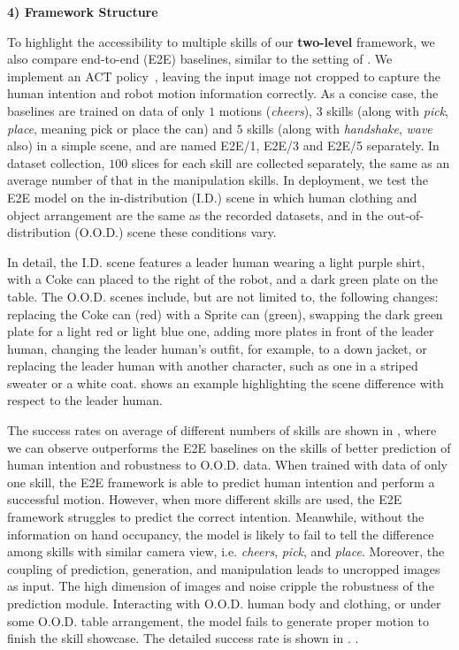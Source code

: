 \noindent\textbf{4) Framework Structure}


To highlight the accessibility to multiple skills of our \textbf{two-level} framework, we also compare end-to-end (E2E) baselines, similar to the setting of \citet{cardenas2024xbg}. 
We implement an ACT policy~\cite{zhao2023learning,cheng2024tv}, leaving the input image not cropped to capture the human intention and robot motion information correctly.
As a concise case, the baselines are trained on data of only $1$ motions (\textit{cheers}), $3$ skills (along with \textit{pick}, \textit{place}, meaning pick or place the can) and $5$ skills (along with \textit{handshake}, \textit{wave} also) in a simple scene, and are named E2E/1, E2E/3 and E2E/5 separately. 
In dataset collection, $100$ slices for each skill are collected separately, the same as an average number of that in the manipulation skills.
In deployment, we test the E2E model on the in-distribution (I.D.) scene in which human clothing and object arrangement are the same as the recorded datasets, and in the out-of-distribution (O.O.D.) scene these conditions vary.

In detail, the I.D. scene features a leader human wearing a light purple shirt, with a Coke can placed to the right of the robot, and a dark green plate on the table.
The O.O.D. scenes include, but are not limited to, the following changes: replacing the Coke can (red) with a Sprite can (green), swapping the dark green plate for a light red or light blue one, adding more plates in front of the leader human, changing the leader human's outfit, for example, to a down jacket, or replacing the leader human with another character, such as one in a striped sweater or a white coat.
 shows an example highlighting the scene difference with respect to the leader human.

The success rates on average of different numbers of skills are shown in , where we can observe \our outperforms the E2E baselines on the skills of better prediction of human intention and robustness to O.O.D. data. 
When trained with data of only one skill, the E2E framework is able to predict human intention and perform a successful motion. 
However, when more different skills are used, the E2E framework struggles to predict the correct intention.
Meanwhile, without the information on hand occupancy, the model is likely to fail to tell the difference among skills with similar camera view, i.e. \textit{cheers}, \textit{pick}, and \textit{place}.
Moreover, the coupling of prediction, generation, and manipulation leads to uncropped images as input.
The high dimension of images and noise cripple the robustness of the prediction module.
Interacting with O.O.D. human body and clothing, or under some O.O.D. table arrangement, the model fails to generate proper motion to finish the skill showcase.
The detailed success rate is shown in .
.
